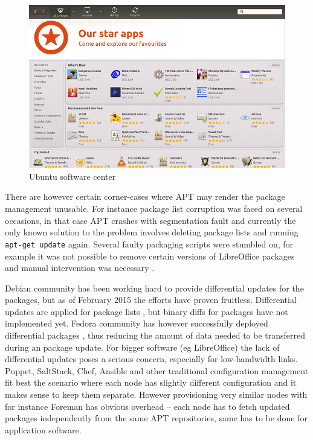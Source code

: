 \documentclass[a4paper,11pt]{kth-mag}
\begin{document}
\begin{figure}[tbhp]
  \centering
  \includegraphics[width=\textwidth]{images/ubuntu-software-center.png}
  \caption{Ubuntu software center}
  \label{fig:ubuntu-software-center}
\end{figure}

There are however certain corner-cases where APT may render
the package management unusable.
For instance package list corruption was faced on several occasions,
in that case APT crashes with segmentation fault
\cite{apt-segfault}
and currently the only known solution to the problem
involves deleting package lists and running \lstinline!apt-get update! again.
Several faulty packaging scripts were stumbled on,
for example it was not possible to remove certain versions of LibreOffice packages
and manual intervention was necessary
\cite{upgrading-libreoffice}.

Debian community has been working hard to provide differential updates for
the packages, but as of February 2015 the efforts have proven fruitless.
Differential updates are applied for package lists
\cite{avoiding-slow-package-updates},
but binary diffs for packages have not implemented yet.
Fedora community has however successfully deployed differential packages
\cite{fedora-presto},
thus reducing the amount of data needed to be transferred during an package update.
For bigger software (eg LibreOffice) the lack of differential
updates poses a serious concern, especially for low-bandwidth links.
Puppet, SaltStack, Chef, Ansible and other traditional configuration
management fit best the scenario where each node has slightly different
configuration and it makes sense to keep them separate. However
provisioning very similar nodes with for instance Foreman has obvious
overhead -- each node has to fetch updated packages independently from
the same APT repositories, same has to be done for application software.
\end{document}

